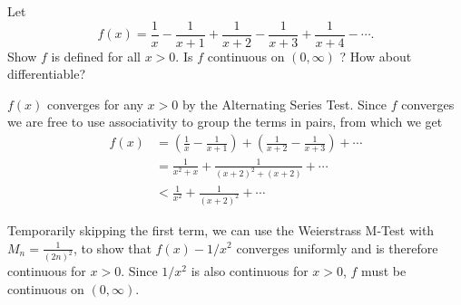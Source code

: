 \begin{exercise}
  Let
  $$
  f(x)=\frac{1}{x}-\frac{1}{x+1}+\frac{1}{x+2}-\frac{1}{x+3}+\frac{1}{x+4}-\cdots .
  $$
  Show $f$ is defined for all $x>0$. Is $f$ continuous on $(0, \infty)$ ? How about differentiable?
\end{exercise}
\begin{solution}
 \(f(x)\) converges for any \(x > 0\) by the Alternating Series Test. Since \(f\) converges we are free to use associativity to group the terms in pairs, from which we get
 \[ \begin{aligned}
    f(x) &= \left(\frac{1}{x}-\frac{1}{x+1}\right) + \left(\frac{1}{x+2}-\frac{1}{x+3}\right)+\cdots \\
    &= \frac{1}{x^2 + x} + \frac{1}{(x+2)^2 + (x+2)}+ \cdots \\
    &< \frac{1}{x^2} + \frac{1}{(x+2)^2} + \cdots
 \end{aligned}
    \]
\end{solution}
Temporarily skipping the first term, we can use the Weierstrass M-Test with \(M_n = \frac{1}{(2n)^2}\), to show that \(f(x) - 1/x^2\) converges uniformly and is therefore continuous for \(x>0\). Since \(1/x^2\) is also continuous for \(x > 0\), \(f\) must be continuous on \((0, \infty)\).

